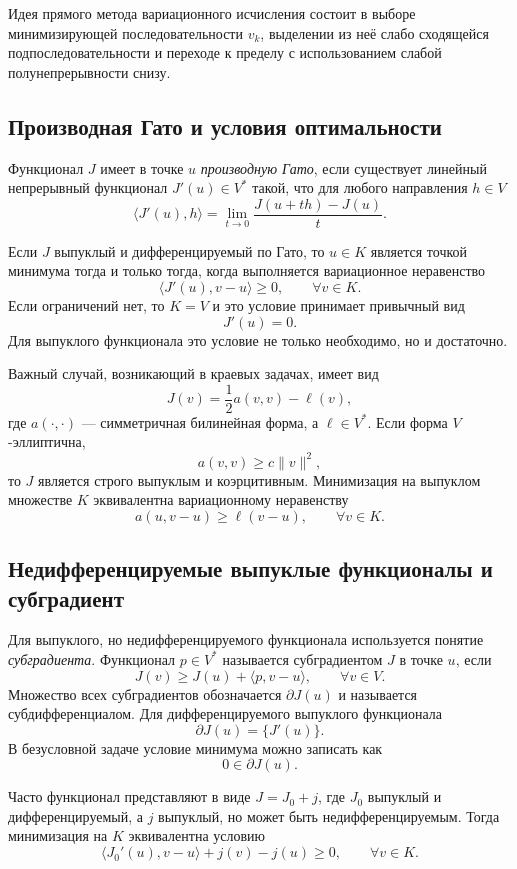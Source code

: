 Идея прямого метода вариационного исчисления состоит в выборе минимизирующей
последовательности $v_k$, выделении из неё слабо сходящейся подпоследовательности
и переходе к пределу с использованием слабой полунепрерывности снизу.

\subsection{Производная Гато и условия оптимальности}

Функционал $J$ имеет в точке $u$ \emph{производную Гато}, если существует линейный
непрерывный функционал $J'(u)\in V^*$ такой, что для любого направления $h\in V$
\[
    \langle J'(u),h\rangle
    =\lim_{t\to0}
      \frac{J(u+th)-J(u)}{t}.
\]

Если $J$ выпуклый и дифференцируемый по Гато, то $u\in K$ является точкой
минимума тогда и только тогда, когда выполняется вариационное неравенство
\[
    \langle J'(u),v-u\rangle\geq0,
    \qquad \forall v\in K.
\]
Если ограничений нет, то $K=V$ и это условие принимает привычный вид
\[
    J'(u)=0.
\]
Для выпуклого функционала это условие не только необходимо, но и достаточно.

Важный случай, возникающий в краевых задачах, имеет вид
\[
    J(v)=\frac12 a(v,v)-\ell(v),
\]
где $a(\cdot,\cdot)$ --- симметричная билинейная форма, а $\ell\in V^*$.
Если форма $V$-эллиптична,
\[
    a(v,v)\geq c\|v\|^2,
\]
то $J$ является строго выпуклым и коэрцитивным. Минимизация на выпуклом
множестве $K$ эквивалентна вариационному неравенству
\[
    a(u,v-u)\geq \ell(v-u),
    \qquad \forall v\in K.
\]

\subsection{Недифференцируемые выпуклые функционалы и субградиент}

Для выпуклого, но недифференцируемого функционала используется понятие
\emph{субградиента}. Функционал $p\in V^*$ называется субградиентом $J$ в точке
$u$, если
\[
    J(v)\geq J(u)+\langle p,v-u\rangle,
    \qquad \forall v\in V.
\]
Множество всех субградиентов обозначается $\partial J(u)$ и называется
субдифференциалом. Для дифференцируемого выпуклого функционала
\[
    \partial J(u)=\{J'(u)\}.
\]
В безусловной задаче условие минимума можно записать как
\[
    0\in\partial J(u).
\]

Часто функционал представляют в виде $J=J_0+j$, где $J_0$ выпуклый и
дифференцируемый, а $j$ выпуклый, но может быть недифференцируемым. Тогда
минимизация на $K$ эквивалентна условию
\[
    \langle J_0'(u),v-u\rangle+j(v)-j(u)\geq0,
    \qquad \forall v\in K.
\]


